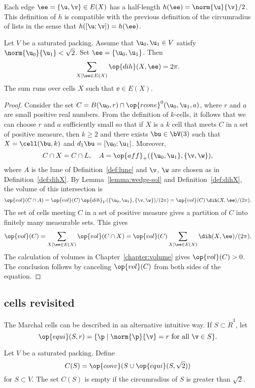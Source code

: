 Each
edge $\ee=\{ \u, \v\}\in E(X)$ has a half-length
$h(\ee) = \norm{ \u}{ \v}/2$.
This definition of $h$ is compatible with the previous definition of the circumradius
of lists in the sense that
$h([\u;\v]) = h(\ee)$.

\begin{lemma}
  Let $V$ be a saturated packing.  Assume that $\u_0,\u_1\in V$
  satisfy $\norm{\u_0}{\u_1}<\sqrt2$.  Set $\ee=\{\u_0,\u_1\}$.  Then
\[
\sum_{X\mid \ee\in E(X) } \op{dih}(X,\ee) = 2\pi.
\]
The sum runs over cells $X$ such that $\ee\in E(X)$.
\end{lemma}

\begin{proof} 
  Consider the set $C=B(\u_0,r)\cap \op{rcone}^0(\u_0,\u_1,a)$, where
  $r$ and $a$ are small positive real numbers.  From the definition of
  $k$-cells, it follows that we can choose $r$ and $a$ sufficiently
  small so that if $X$ is a $k$ cell that meets $C$ in a set of
  positive measure, then $k\ge 2$ and there exists $\bu\in \bV(3)$
  such that $X=\cell(\bu,k)$ and $d_1\bu=[\u_0;\u_1]$.  Moreover,
\[
C\cap X = C\cap L, \quad A=\op{aff}_+(\{\u_0,\u_1\},\{\v,\w\}),
\]
where $A$ is the lune of Definition~\ref{def:lune} and $\v$, $\w$ are
chosen as in Definition~\ref{def:dihX}.  By
Lemma~\ref{lemma:wedge-sol} and Definition~\ref{def:dihX}, the volume
of this intersection is
\[
\op{vol}(C\cap A) = \op{vol}(C)\,
 {\op{dih}_V(\{\u_0,\u_1\},\{\v,\w\}) }/{(2\pi)} =
  \op{vol}(C)\, {\dih(X,\ee)}/{(2\pi)}.
\]
The set of cells meeting $C$ in a set of positive measure gives a 
partition of $C$ into finitely many measurable sets.
This gives
\[
\op{vol}(C) = \sum_{X\mid \ee\in E(X)} \op{vol}(C\cap X)  = 
\op{vol}(C)\sum_{X\mid \ee\in E(X)} \dih(X,\ee)/(2\pi).
\]
The calculation of volumes in Chapter~\ref{chapter:volume} gives
$\op{vol}(C)>0$.  The conclusion follows by canceling $\op{vol}(C)$
from both sides of the equation.
\end{proof}


\subsection{cells revisited}

The Marchal cells can be described in an alternative intuitive way.
If $S\subset\ring{R}^3$, let
\[
\op{equi}(S,r) = \{ \p \mid \norm{\p}{\v} = r \text{ for all } \v \in S \}.
\]


Let $V$ be a saturated packing.  Define
\[
C(S) = \op{conv} (S\cup\op{equi}(S, \sqrt2) )
\]
for $S\subset V$.  The set $C(S)$ is empty if the circumradius of $S$
is greater than $\sqrt2$.

